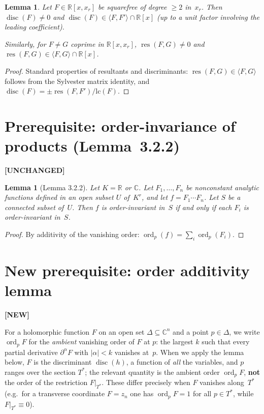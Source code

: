\documentclass[11pt]{article}
\theoremstyle{plain}
\newtheorem{lemma}[theorem]{Lemma}
\theoremstyle{definition}
\newcommand{\R}{\mathbb{R}}
\newcommand{\C}{\mathbb{C}}
\DeclareMathOperator{\ord}{ord}
\DeclareMathOperator{\res}{res}
\DeclareMathOperator{\disc}{disc}
\begin{document}
\begin{lemma}
\label{lem:discr_in_elim}
Let $F \in \R[x, x_r]$ be squarefree of degree $\ge 2$ in~$x_r$.
Then $\disc(F) \ne 0$ and $\disc(F) \in \langle F, F' \rangle \cap \R[x]$
(up to a unit factor involving the leading coefficient).

Similarly, for $F \ne G$ coprime in $\R[x, x_r]$,
$\res(F, G) \ne 0$ and
$\res(F, G) \in \langle F, G \rangle \cap \R[x]$.
\end{lemma}
\begin{proof}
Standard properties of resultants and discriminants:
$\res(F, G) \in \langle F, G \rangle$ follows from the
Sylvester matrix identity, and $\disc(F) = \pm \res(F, F') / \mathrm{lc}(F)$.
\end{proof}

\section{Prerequisite: order-invariance of products (Lemma~3.2.2)}
\label{sec:lemma_322}

\textbf{[UNCHANGED]}

\begin{lemma}[Lemma 3.2.2]
\label{lem:order_mul}
Let $K = \R$ or $\C$.  Let $F_1, \ldots, F_n$ be nonconstant analytic
functions defined in an open subset $U$ of~$K^r$, and let
$f = F_1 \cdots F_n$.  Let $S$ be a connected subset of~$U$.  Then $f$
is order-invariant in~$S$ if and only if each $F_i$ is order-invariant
in~$S$.
\end{lemma}
\begin{proof}
By additivity of the vanishing order:
$\ord_p(f) = \sum_i \ord_p(F_i)$.
\end{proof}

\section{New prerequisite: order additivity lemma}
\label{sec:order_additivity}

\textbf{[NEW]}

For a holomorphic function $F$ on an open set $\Delta \subseteq \C^n$ and a
point $p \in \Delta$, we write $\ord_p F$ for the \emph{ambient} vanishing
order of $F$ at $p$: the largest $k$ such that every partial derivative
$\partial^\alpha F$ with $|\alpha| < k$ vanishes at~$p$.  When we apply the
lemma below, $F$ is the discriminant $\disc(h)$, a function of \emph{all} the
variables, and $p$ ranges over the section $T^*$; the relevant quantity is the
ambient order $\ord_p F$, \textbf{not} the order of the restriction
$F|_{T^*}$.  These differ precisely when $F$ vanishes along~$T^*$ (e.g.\ for a
transverse coordinate $F = z_n$ one has $\ord_p F = 1$ for all $p \in T^*$,
while $F|_{T^*} \equiv 0$).
\end{document}
